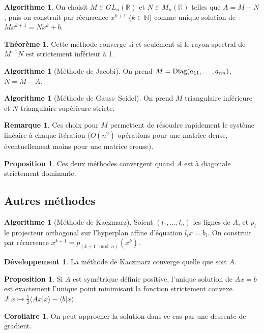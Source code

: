 \documentclass[11pt,a4paper,twocolumn]{article}
\theoremstyle{definition}
\newtheorem{proposition}[equation]{Proposition}
\newtheorem{theorem}[equation]{Théorème}
\newtheorem{algo}[equation]{Algorithme}
\newtheorem{remark}[equation]{Remarque}
\newtheorem{corollary}[equation]{Corollaire}
\newcounter{n}
\newtheorem{dev}[n]{Développement}
\def\N{\mathbb{N}}
\def\R{\mathbb{R}}
\begin{document}
\begin{algo}
  On choisit $M \in GL_n(\R)$ et $N \in M_n(\R)$ telles que $A = M - N$, puis on
  construit par récurrence $x^{k+1}$ ($k \in \N$) comme unique solution de
  $Mx^{k+1} = Nx^k + b$.
\end{algo}
\begin{theorem}
  Cette méthode converge si et seulement si le rayon spectral de $M^{-1}N$ est
  strictement inférieur à 1.
\end{theorem}
\begin{algo}[Méthode de Jacobi]
  On prend $M = \textnormal{Diag}(a_{11}, \ldots, a_{nn})$, $N = M - A$.
\end{algo}
\begin{algo}[Méthode de Gauss--Seidel]
  On prend $M$ triangulaire inférieure et $N$ triangulaire supérieure stricte.
\end{algo}
\begin{remark}
  Ces choix pour $M$ permettent de résoudre rapidement le système linéaire à
  chaque itération ($O(n^2)$ opérations pour une matrice dense, éventuellement
  moins pour une matrice creuse).
\end{remark}
\begin{proposition}
  Ces deux méthodes convergent quand $A$ est à diagonale strictement dominante.
\end{proposition}

\subsection{Autres méthodes}

\begin{algo}[Méthode de Kaczmarz]
  Soient $(l_1, \ldots, l_n)$ les lignes de $A$, et $p_i$ le projecteur
  orthogonal sur l'hyperplan affine d'équation $l_i x = b_i$. On construit par
  récurrence $x^{k+1} = p_{(k+1 \mod n)}(x^{k})$.
\end{algo}
\begin{dev}
  La méthode de Kaczmarz converge quelle que soit $A$.
\end{dev}

\begin{proposition}
  Si $A$ est symétrique définie positive, l'unique solution de $Ax = b$ est
  exactement l'unique point minimisant la fonction strictement convexe $J : x
  \mapsto \frac{1}{2} \langle Ax | x \rangle - \langle b | x \rangle$.
\end{proposition}
\begin{corollary}
  On peut approcher la solution dans ce cas par une descente de gradient.
\end{corollary}
\end{document}
